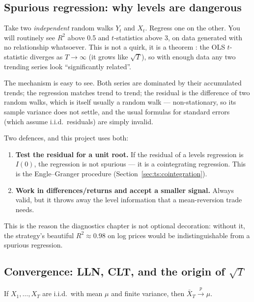 \subsection{Spurious regression: why levels are dangerous}
\label{sec:prob:spurious}

Take two \emph{independent} random walks $Y_t$ and $X_t$. Regress one on the other. You
will routinely see $R^2$ above 0.5 and $t$-statistics above 3, on data generated with no
relationship whatsoever. This is not a quirk, it is a theorem
\cite{grangernewbold1974}: the OLS $t$-statistic diverges as $T\to\infty$
(it grows like $\sqrt T$), so with enough data any two trending series look
``significantly related''.

The mechanism is easy to see. Both series are dominated by their accumulated trends; the
regression matches trend to trend; the residual is the difference of two random walks,
which is itself usually a random walk --- non-stationary, so its sample variance does
not settle, and the usual formulas for standard errors (which assume i.i.d.\ residuals)
are simply invalid.

Two defences, and this project uses both:
\begin{enumerate}
  \item \textbf{Test the residual for a unit root.} If the residual of a levels
    regression is $I(0)$, the regression is not spurious --- it is a cointegrating
    regression. This is the Engle--Granger procedure
    (Section~\ref{sec:ts:cointegration}).
  \item \textbf{Work in differences/returns and accept a smaller signal.} Always valid,
    but it throws away the level information that a mean-reversion trade needs.
\end{enumerate}

This is the reason the diagnostics chapter is not optional decoration: without it, the
strategy's beautiful $R^2\approx0.98$ on log prices would be indistinguishable from a
spurious regression.

\subsection{Convergence: LLN, CLT, and the origin of $\sqrt T$}
\label{sec:prob:clt}

\begin{theorem}
If $X_1,\dots,X_T$ are i.i.d.\ with mean $\mu$ and finite variance, then
$\bar X_T \xrightarrow{\ p\ } \mu$.
\end{theorem}

